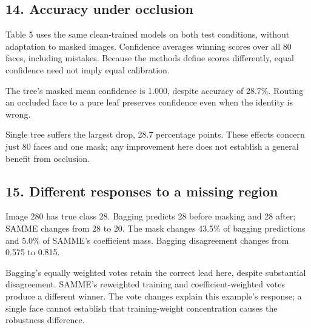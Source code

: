 \documentclass[10pt,twocolumn,letterpaper]{article}
\begin{document}
\subsection*{14. Accuracy under occlusion}
Table 5 uses the same clean-trained models on both test conditions, without adaptation to masked images. Confidence averages winning scores over all 80 faces, including mistakes. Because the methods define scores differently, equal confidence need not imply equal calibration.

The tree's masked mean confidence is 1.000, despite accuracy of 28.7\%. Routing an occluded face to a pure leaf preserves confidence even when the identity is wrong.

Single tree suffers the largest drop, 28.7 percentage points.  These effects concern just 80 faces and one mask; any improvement here does not establish a general benefit from occlusion.

\newpage
\subsection*{15. Different responses to a missing region}
Image 280 has true class 28. Bagging predicts 28 before masking and 28 after; SAMME changes from 28 to 20. The mask changes 43.5\% of bagging predictions and 5.0\% of SAMME's coefficient mass. Bagging disagreement changes from 0.575 to 0.815.

Bagging's equally weighted votes retain the correct lead here, despite substantial disagreement. SAMME's reweighted training and coefficient-weighted votes produce a different winner. The vote changes explain this example's response; a single face cannot establish that training-weight concentration causes the robustness difference.
\end{document}
